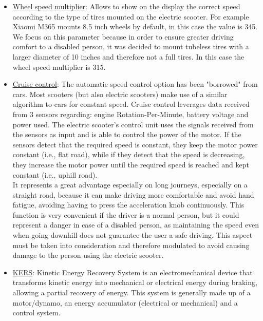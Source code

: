 \documentclass[binding=0.6cm,LaM,noexaminfo]{sapthesis}
\begin{document}
\begin{itemize}
    \item \underline{Wheel speed multiplier}: Allows to show on the display the correct speed according to the type of tires mounted on the electric scooter. For example Xiaomi M365 mounts 8.5 inch wheels by default, in this case the value is 345. We focus on this parameter because in order to ensure greater driving comfort to a disabled person, it was decided to mount tubeless tires with a larger diameter of 10 inches and therefore not a full tires. In this case the wheel speed multiplier is 315. 
    \item \underline{Cruise control}: The automatic speed control option has been "borrowed" from cars. Most scooters (but also electric scooters) make use of a similar algorithm to cars for constant speed. Cruise control leverages data received from 3 sensors regarding: engine Rotation-Per-Minute, battery voltage and power used. The electric scooter's control unit uses the signals received from the sensors as input and is able to control the power of the motor. If the sensors detect that the required speed is constant, they keep the motor power constant (i.e., flat road), while if they detect that the speed is decreasing, they increase the motor power until the required speed is reached and kept constant (i.e., uphill road). \\ 
    It represents a great advantage especially on long journeys, especially on a straight road, because it can make driving more comfortable and avoid hand fatigue, avoiding having to press the acceleration knob continuously. This function is very convenient if the driver is a normal person, but it could represent a danger in case of a disabled person, as maintaining the speed even when going downhill does not guarantee the user a safe driving. This aspect must be taken into consideration and therefore modulated to avoid causing damage to the person using the electric scooter.
    
    \item \underline{KERS}: Kinetic Energy Recovery System is an electromechanical device that transforms kinetic energy into mechanical or electrical energy during braking, allowing a partial recovery of energy. This system is generally made up of a motor/dynamo, an energy accumulator (electrical or mechanical) and a control system.
    

\end{itemize}
\end{document}
